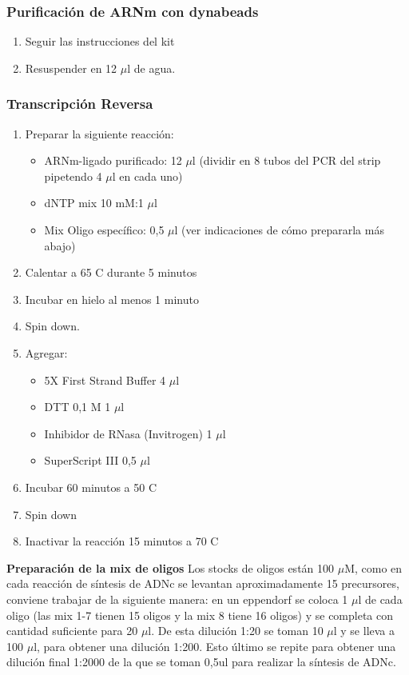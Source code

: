 \subsubsection{Purificación de ARNm con dynabeads}
\begin{enumerate}
	\item Seguir las instrucciones del kit
	\item Resuspender en 12 $\mu$l de agua.
\end{enumerate}


\subsubsection{Transcripción Reversa}
\begin{enumerate}
	\item Preparar la siguiente reacción:
	\begin{itemize}
		\item ARNm-ligado purificado: 12 $\mu$l (dividir en 8 tubos del PCR del strip pipetendo 4 $\mu$l en cada uno)
		\item dNTP mix 10 mM:1 $\mu$l
		\item Mix Oligo específico: 0,5 $\mu$l (ver indicaciones de cómo prepararla más abajo)
	\end{itemize}
	\item Calentar a 65 \degree C durante 5 minutos
	\item Incubar en hielo al menos 1 minuto
	\item Spin down. 
	\item Agregar:
	\begin{itemize}
		\item 5X First Strand Buffer 4 $\mu$l
		\item DTT 0,1 M 1 $\mu$l
		\item Inhibidor de RNasa (Invitrogen) 1 $\mu$l
		\item SuperScript III 0,5 $\mu$l
	\end{itemize}
	\item Incubar 60 minutos a 50 \degree C
	\item Spin down
	\item Inactivar la reacción 15 minutos a 70 \degree C
\end{enumerate}

\textbf{Preparación de la mix de oligos}
Los stocks de oligos están 100 $\mu$M, como en cada reacción de síntesis de ADNc se levantan aproximadamente 15 precursores, conviene trabajar de la siguiente manera: en un eppendorf se coloca 1 $\mu$l de cada oligo (las mix 1-7 tienen 15 oligos y la mix 8 tiene 16 oligos)  y se completa con cantidad suficiente para 20 $\mu$l.
De esta dilución 1:20 se toman 10 $\mu$l y se lleva a 100 $\mu$l, para obtener una dilución 1:200.
Esto último se repite para obtener una dilución final 1:2000 de la que se toman 0,5ul para realizar la síntesis de ADNc.  

